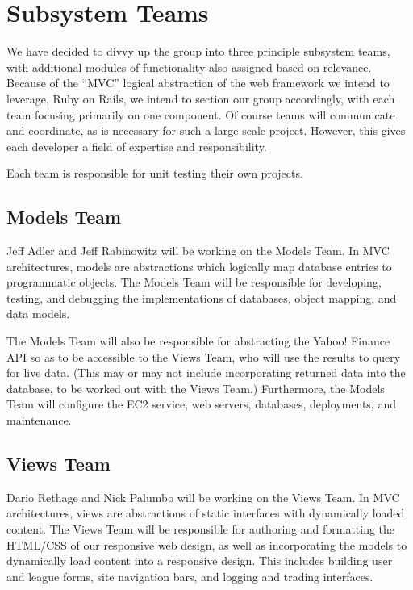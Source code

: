 \documentclass[11pt,letterpaper,oneside]{memoir}
\begin{document}
\chapter{Subsystem Teams}

We have decided to divvy up the group into three principle subsystem teams, with additional
modules of functionality also assigned based on relevance. Because of the ``MVC'' logical
abstraction of the web framework we intend to leverage, Ruby on Rails, we intend to 
section our group accordingly, with each team focusing primarily on one component. Of course
teams will communicate and coordinate, as is necessary for such a large scale project.
However, this gives each developer a field of expertise and responsibility.

Each team is responsible for unit testing their own projects.

\section{Models Team}

Jeff Adler and Jeff Rabinowitz will be working on the Models Team. In MVC architectures, models
are abstractions which logically map database entries to programmatic objects. The Models Team
will be responsible for developing, testing, and debugging the implementations of databases,
object mapping, and data models. 

The Models Team will also be responsible for abstracting the Yahoo! Finance API so as to be 
accessible to the Views Team, who will use the results to query for live data. (This may
or may not include incorporating returned data into the database, to be worked out with the 
Views Team.)
Furthermore, the Models Team will configure the EC2 service, web servers, databases, 
deployments, and maintenance. 

\section{Views Team}

Dario Rethage and Nick Palumbo will be working on the Views Team. In MVC architectures, views
are abstractions of static interfaces with dynamically loaded content. The Views Team will be 
responsible for authoring and formatting the HTML/CSS of our responsive web design, as well
as incorporating the models to dynamically load content into a responsive design. This includes
building user and league forms, site navigation bars, and logging and trading interfaces.
\end{document}
